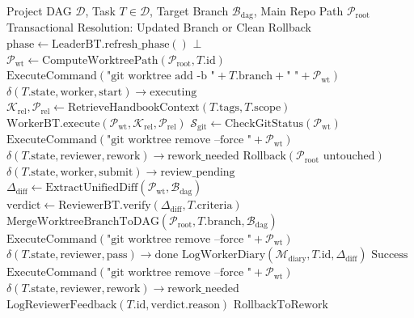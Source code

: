 \documentclass[conference]{IEEEtran}
\begin{document}
\begin{algorithm}[t]
\caption{Transactional Task Scheduling with Worktree Isolation}
\label{alg:scheduling}
\begin{algorithmic}[1]
\REQUIRE Project DAG $\mathcal{D}$, Task $T \in \mathcal{D}$, Target Branch $\mathcal{B}_{\text{dag}}$, Main Repo Path $\mathcal{P}_{\text{root}}$
\ENSURE Transactional Resolution: Updated Branch or Clean Rollback
\STATE $\text{phase} \leftarrow \text{LeaderBT.refresh\_phase}()$
    \RETURN $\bot$ 
\ENDIF
\STATE $\mathcal{P}_{\text{wt}} \leftarrow \text{ComputeWorktreePath}(\mathcal{P}_{\text{root}}, T.\text{id})$
\STATE $\text{ExecuteCommand}(\text{"git worktree add -b "} + T.\text{branch} + \text{" "} + \mathcal{P}_{\text{wt}})$
\STATE $\delta(T.\text{state}, \text{worker}, \text{start}) \to \text{executing}$
\STATE $\mathcal{K}_{\text{rel}}, \mathcal{P}_{\text{rel}} \leftarrow \text{RetrieveHandbookContext}(T.\text{tags}, T.\text{scope})$
\STATE $\text{WorkerBT.execute}(\mathcal{P}_{\text{wt}}, \mathcal{K}_{\text{rel}}, \mathcal{P}_{\text{rel}})$
\STATE $\mathcal{S}_{\text{git}} \leftarrow \text{CheckGitStatus}(\mathcal{P}_{\text{wt}})$
    \STATE $\text{ExecuteCommand}(\text{"git worktree remove --force "} + \mathcal{P}_{\text{wt}})$
    \STATE $\delta(T.\text{state}, \text{reviewer}, \text{rework}) \to \text{rework\_needed}$
    \RETURN $\text{Rollback}(\mathcal{P}_{\text{root}} \text{ untouched})$
\ENDIF
\STATE $\delta(T.\text{state}, \text{worker}, \text{submit}) \to \text{review\_pending}$
\STATE $\Delta_{\text{diff}} \leftarrow \text{ExtractUnifiedDiff}(\mathcal{P}_{\text{wt}}, \mathcal{B}_{\text{dag}})$
\STATE $\text{verdict} \leftarrow \text{ReviewerBT.verify}(\Delta_{\text{diff}}, T.\text{criteria})$
    \STATE $\text{MergeWorktreeBranchToDAG}(\mathcal{P}_{\text{root}}, T.\text{branch}, \mathcal{B}_{\text{dag}})$
    \STATE $\text{ExecuteCommand}(\text{"git worktree remove --force "} + \mathcal{P}_{\text{wt}})$
    \STATE $\delta(T.\text{state}, \text{reviewer}, \text{pass}) \to \text{done}$
    \STATE $\text{LogWorkerDiary}(\mathcal{M}_{\text{diary}}, T.\text{id}, \Delta_{\text{diff}})$
    \RETURN $\text{Success}$
\ELSE
    \STATE $\text{ExecuteCommand}(\text{"git worktree remove --force "} + \mathcal{P}_{\text{wt}})$
    \STATE $\delta(T.\text{state}, \text{reviewer}, \text{rework}) \to \text{rework\_needed}$
    \STATE $\text{LogReviewerFeedback}(T.\text{id}, \text{verdict}.\text{reason})$
    \RETURN $\text{RollbackToRework}$
\ENDIF
\end{algorithmic}
\end{algorithm}
\end{document}
